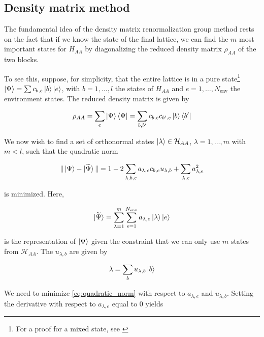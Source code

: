 \subsection{Density matrix method}

The fundamental idea of the density matrix renormalization group method
rests on the fact that if we know the state of the final lattice, we can find the $m$
most important states for $H_{AA}$ by diagonalizing the reduced density
matrix $\rho_{AA}$ of the two blocks.

To see this, suppose, for simplicity, that the entire lattice is in a pure
state\footnote{For a proof for a mixed state, see \cite{noack1999workshop}} $\ket{\Psi} = \sum c_{b, e} \ket{b} \ket{e}$, with $b = 1, \ldots, l$ the
states of $H_{AA}$ and $e = 1, \ldots, N_{\text{env}}$ the environment states. The
reduced density matrix is given by

\begin{equation}
  \rho_{AA} = \sum_{e} \ket{\Psi} \bra{\Psi} = \sum_{b, b'} c_{b, e} c_{b', e} \ket{b} \bra{b'}
\end{equation}

We now wish to find a set of orthonormal states $\ket{\lambda} \in \mathcal{H}_{AA}$,
$\lambda = 1, \ldots, m$ with $m < l$, such that the quadratic norm

\begin{equation}\label{eq:quadratic_norm}
  \Vert \ket{\Psi} - \ket{\widetilde{\Psi}} \Vert = 1 - 2 \sum_{\lambda, b, e} a_{\lambda, e} c_{b, e} u_{\lambda, b} + \sum_{\lambda, e} a_{\lambda, e}^2
\end{equation}

is minimized. Here,

\begin{equation}
  \ket{\widetilde{\Psi}} = \sum_{\lambda = 1}^{m} \sum_{e = 1}^{N_{\text{env}}} a_{\lambda, e} \ket{\lambda} \ket{e}
\end{equation}

is the representation of $\ket{\Psi}$ given the constraint that we can only use
$m$ states from $\mathcal{H}_{AA}$. The $u_{\lambda, b}$ are given by

\begin{equation}
  \lambda = \sum_{b} u_{\lambda, b} \ket{b}
\end{equation}

We need to minimize \eqref{eq:quadratic_norm} with respect to $a_{\lambda, e}$
and $u_{\lambda, b}$. Setting the derivative with respect to $a_{\lambda, e}$ equal to 0 yields

